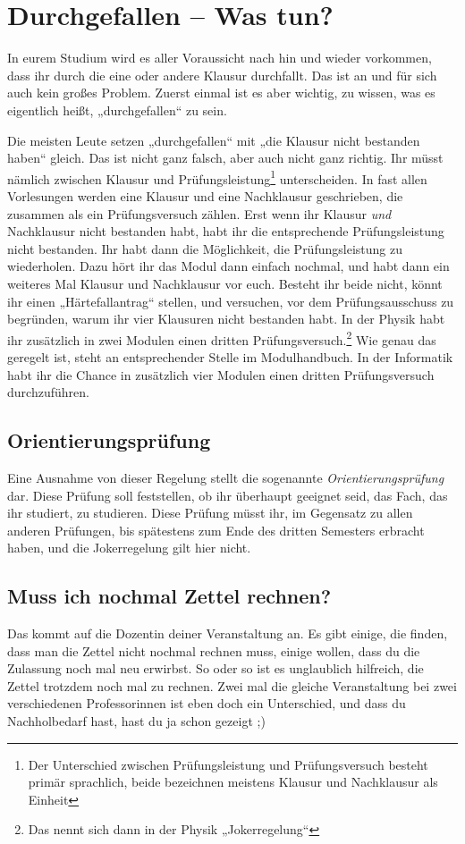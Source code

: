 \newpage\section{Durchgefallen -- Was tun?}

In eurem Studium wird es aller Voraussicht nach hin und wieder vorkommen, dass ihr durch die eine oder andere Klausur durchfallt. Das ist an und für sich auch kein großes Problem. Zuerst einmal ist es aber wichtig, zu wissen, was es eigentlich heißt, „durchgefallen“ zu sein.

Die meisten Leute setzen „durchgefallen“ mit „die Klausur nicht bestanden haben“ gleich. Das ist nicht ganz falsch, aber auch nicht ganz richtig. Ihr müsst nämlich zwischen Klausur und Prüfungsleistung\footnote{ Der Unterschied zwischen Prüfungsleistung und Prüfungsversuch besteht primär sprachlich, beide bezeichnen meistens Klausur und Nachklausur als Einheit} unterscheiden. In fast allen Vorlesungen werden eine Klausur und eine Nachklausur geschrieben, die zusammen als ein Prüfungsversuch zählen. Erst wenn ihr Klausur \emph{und} Nachklausur nicht bestanden habt, habt ihr die entsprechende Prüfungsleistung nicht bestanden. Ihr habt dann die Möglichkeit, die Prüfungsleistung zu wiederholen. Dazu hört ihr das Modul dann einfach nochmal, und habt dann ein weiteres Mal Klausur und Nachklausur vor euch. Besteht ihr beide nicht, könnt ihr einen „Härtefallantrag“ stellen, und versuchen, vor dem Prüfungsausschuss zu begründen, warum ihr vier Klausuren nicht bestanden habt. In der Physik habt ihr zusätzlich in zwei Modulen einen dritten Prüfungsversuch.\footnote{Das nennt sich dann in der Physik „Jokerregelung“} Wie genau das geregelt ist, steht an entsprechender Stelle im Modulhandbuch. In der Informatik habt ihr die Chance in zusätzlich vier Modulen einen dritten Prüfungsversuch durchzuführen.

\subsection{Orientierungsprüfung}
Eine Ausnahme von dieser Regelung stellt die sogenannte \emph{Orientierungsprüfung} dar. Diese Prüfung soll feststellen, ob ihr überhaupt geeignet seid, das Fach, das ihr studiert, zu studieren. Diese Prüfung müsst ihr, im Gegensatz zu allen anderen Prüfungen, bis spätestens zum Ende des dritten Semesters erbracht haben, und die Jokerregelung gilt hier nicht.

\subsection{Muss ich nochmal Zettel rechnen?}
Das kommt auf die Dozentin deiner Veranstaltung an. Es gibt einige, die finden, dass man die Zettel nicht nochmal rechnen muss, einige wollen, dass du die Zulassung noch mal neu erwirbst. So oder so ist es unglaublich hilfreich, die Zettel trotzdem noch mal zu rechnen. Zwei mal die gleiche Veranstaltung bei zwei verschiedenen Professorinnen ist eben doch ein Unterschied, und dass du Nachholbedarf hast, hast du ja schon gezeigt ;)
